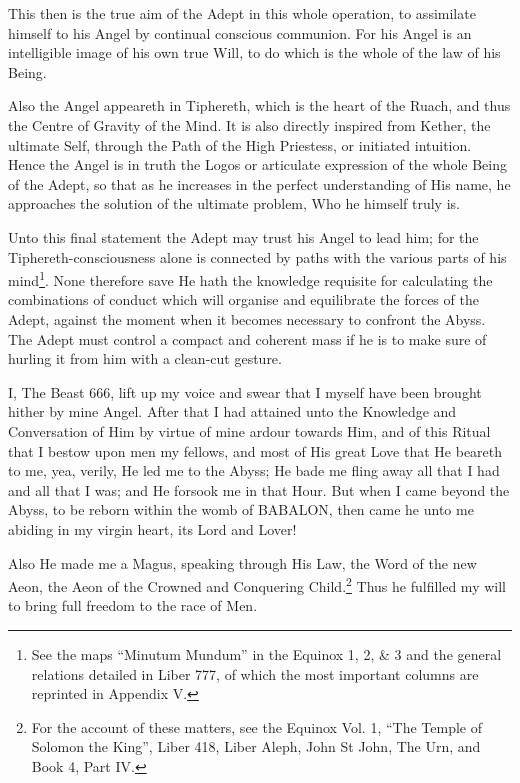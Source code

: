 This then is the true aim of the Adept in this whole operation, to assimilate himself to his Angel by continual conscious communion. For his Angel is an intelligible image of his own true Will, to do which is the whole of the law of his Being.

Also the Angel appeareth in Tiphereth, which is the heart of the Ruach, and thus the Centre of Gravity of the Mind. It is also directly inspired from Kether, the ultimate Self, through the Path of the High Priestess, or initiated intuition. Hence the Angel is in truth the Logos or articulate expression of the whole Being of the Adept, so that as he increases in the perfect understanding of His name, he approaches the solution of the ultimate problem, Who he himself truly is.

Unto this final statement the Adept may trust his Angel to lead him; for the Tiphereth-consciousness alone is connected by paths with the various parts of his mind\footnote{See the maps \enquote{Minutum Mundum} in the Equinox 1, 2, \& 3 and the general relations detailed in Liber 777, of which the most important columns are reprinted in Appendix V.}. None therefore save He hath the knowledge requisite for calculating the combinations of conduct which will organise and equilibrate the forces of the Adept, against the moment when it becomes necessary to confront the Abyss. The Adept must control a compact and coherent mass if he is to make sure of hurling it from him with a clean-cut gesture.

I, The Beast 666, lift up my voice and swear that I myself have been brought hither by mine Angel. After that I had attained unto the Knowledge and Conversation of Him by virtue of mine ardour towards Him, and of this Ritual that I bestow upon men my fellows, and most of His great Love that He beareth to me, yea, verily, He led me to the Abyss; He bade me fling away all that I had and all that I was; and He forsook me in that Hour. But when I came beyond the Abyss, to be reborn within the womb of BABALON, then came he unto me abiding in my virgin heart, its Lord and Lover!

Also He made me a Magus, speaking through His Law, the Word of the new Aeon, the Aeon of the Crowned and Conquering Child.\footnote{For the account of these matters, see the Equinox Vol. 1, \enquote{The Temple of Solomon the King}, Liber 418, Liber Aleph, John St John, The Urn, and Book 4, Part IV.} Thus he fulfilled my will to bring full freedom to the race of Men.

